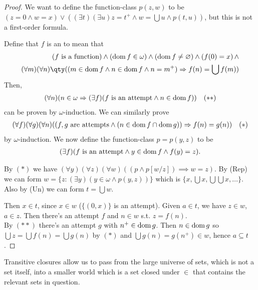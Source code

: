 \begin{proof}
    We want to define the function-class $p(z,w)$ to be $(z = 0 \wedge w = x) \vee ((\exists t)(\exists u) z = t^+ \wedge w = \bigcup u \wedge p(t,u))$, but this is not a first-order formula.

    Define that $f$ is an  to mean that
    \begin{align*}
        (f \text{ is a function}) \wedge (\dom f \in \omega) \wedge (\dom f \neq \varnothing) \wedge (f(0) = x)\, \wedge \\
        (\forall m)(\forall n)\qty((m \in \dom f \wedge n \in \dom f \wedge n = m^+) \implies f(n) = \bigcup f(m))
    \end{align*}
    Then,
    \begin{align*}
        (\forall n)(n \in \omega \Rightarrow (\exists f)(f \text{ is an attempt} \wedge n \in \operatorname{dom} f)) \quad (\ast\ast)
    \end{align*}
    can be proven by $\omega$-induction.
    We can similarly prove
    \begin{align*}
        (\forall f)(\forall g)(\forall n)((f, g \text{ are attempts} \wedge (n \in \operatorname{dom} f \cap \operatorname{dom} g)) \Rightarrow f(n) = g(n)) \quad (\ast)
    \end{align*}
    by $\omega$-induction.
    We now define the function-class $p = p(y, z)$ to be
    \begin{align*}
        (\exists f)(f \text{ is an attempt} \wedge y \in \operatorname{dom} f \wedge f(y) = z).
    \end{align*}

    By $(\ast)$ we have $(\forall y)(\forall z)(\forall w)((p \wedge p[w/z]) \implies w = z)$.
    By (Rep) we can form $w = \{z : (\exists y)(y \in \omega \wedge p(y, z))\}$ which is $\{x, \bigcup x, \bigcup \bigcup x, \dots\}$.
    Also by (Un) we can form $t = \bigcup w$.

    Then $x \in t$, since $x \in w$ ($\{(0, x)\}$ is an attempt).
    Given $a \in t$, we have $z \in w$, $a \in z$.
    Then there's an attempt $f$ and $n \in w$ s.t. $z = f(n)$. \\
    By $(\ast\ast)$ there's an attempt $g$ with $n^+ \in \operatorname{dom} g$.
    Then $n \in \operatorname{dom} g$ so $\bigcup z = \bigcup f(n) = \bigcup g(n)$ by $(\ast)$ and $\bigcup g(n) = g(n^+) \in w$, hence $a \subseteq t$.
\end{proof}

Transitive closures allow us to pass from the large universe of sets, which is not a set itself, into a smaller world which is a set closed under $\in$ that contains the relevant sets in question.

